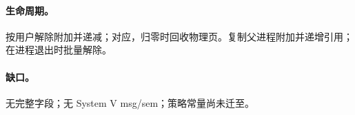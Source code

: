 \paragraph{生命周期。}
按用户解除附加并递减；对应，归零时回收物理页。复制父进程附加并递增引用；在进程退出时批量解除。

\paragraph{缺口。}
无完整字段；无 System V msg/sem；策略常量尚未迁至。
